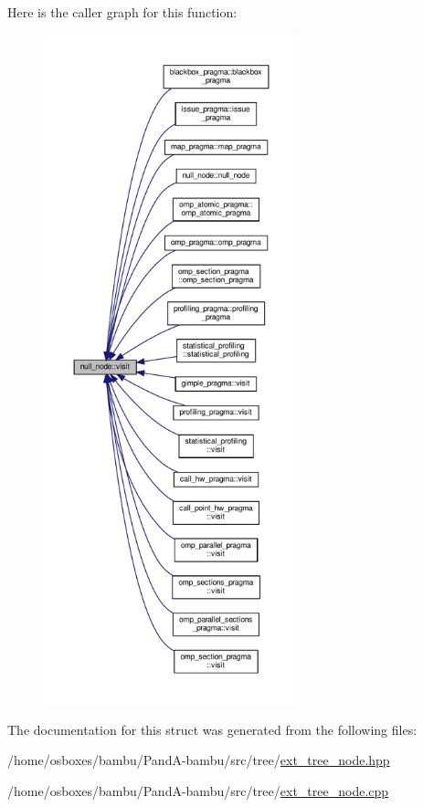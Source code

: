 Here is the caller graph for this function\+:
\nopagebreak
\begin{figure}[H]
\begin{center}
\leavevmode
\includegraphics[height=550pt]{dc/dae/structnull__node_a2ca249a9a55f750dad7443b376af929c_icgraph}
\end{center}
\end{figure}


The documentation for this struct was generated from the following files\+:\begin{DoxyCompactItemize}
\item 
/home/osboxes/bambu/\+Pand\+A-\/bambu/src/tree/\hyperlink{ext__tree__node_8hpp}{ext\+\_\+tree\+\_\+node.\+hpp}\item 
/home/osboxes/bambu/\+Pand\+A-\/bambu/src/tree/\hyperlink{ext__tree__node_8cpp}{ext\+\_\+tree\+\_\+node.\+cpp}\end{DoxyCompactItemize}
